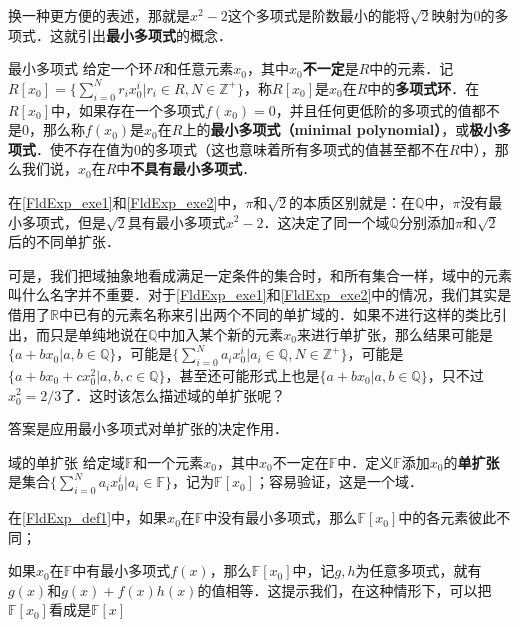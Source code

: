 换一种更方便的表述，那就是$x^2-2$这个多项式是阶数最小的能将$\sqrt{2}$映射为$0$的多项式．这就引出\textbf{最小多项式}的概念．

\begin{definition}{最小多项式}
给定一个环$R$和任意元素$x_0$，其中$x_0$\textbf{不一定}是$R$中的元素．记
$R[x_0]=\{\sum_{i=0}^N r_ix_0^i|r_i\in R, N\in\mathbb{Z}^+\}$，称$R[x_0]$是$x_0$在$R$中的\textbf{多项式环}．在$R[x_0]$中，如果存在一个多项式$f(x_0)=0$，并且任何更低阶的多项式的值都不是$0$，那么称$f(x_0)$是$x_0$在$R$上的\textbf{最小多项式（minimal polynomial）}，或\textbf{极小多项式}．使不存在值为$0$的多项式（这也意味着所有多项式的值甚至都不在$R$中），那么我们说，$x_0$在$R$中\textbf{不具有最小多项式}．
\end{definition}

在\autoref{FldExp_exe1}和\autoref{FldExp_exe2}中，$\pi$和$\sqrt{2}$的本质区别就是：在$\mathbb{Q}$中，$\pi$没有最小多项式，但是$\sqrt{2}$具有最小多项式$x^2-2$．这决定了同一个域$\mathbb{Q}$分别添加$\pi$和$\sqrt{2}$后的不同单扩张．

可是，我们把域抽象地看成满足一定条件的集合时，和所有集合一样，域中的元素叫什么名字并不重要．对于\autoref{FldExp_exe1}和\autoref{FldExp_exe2}中的情况，我们其实是借用了$\mathbb{R}$中已有的元素名称来引出两个不同的单扩域的．如果不进行这样的类比引出，而只是单纯地说在$\mathbb{Q}$中加入某个新的元素$x_0$来进行单扩张，那么结果可能是$\{a+bx_0|a, b\in\mathbb{Q}\}$，可能是$\{\sum_{i=0}^N a_ix_0^i|a_i\in\mathbb{Q}, N\in\mathbb{Z}^+\}$，可能是$\{a+bx_0+cx_0^2|a, b, c\in\mathbb{Q}\}$，甚至还可能形式上也是$\{a+bx_0|a, b\in\mathbb{Q}\}$，只不过$x_0^2=2/3$了．这时该怎么描述域的单扩张呢？

答案是应用最小多项式对单扩张的决定作用．

\begin{definition}{域的单扩张}\label{FldExp_def1}
给定域$\mathbb{F}$和一个元素$x_0$，其中$x_0$不一定在$\mathbb{F}$中．定义$\mathbb{F}$添加$x_0$的\textbf{单扩张}是集合$\{\sum_{i=0}^N a_ix_0^i|a_i\in\mathbb{F}\}$，记为$\mathbb{F}[x_0]$；容易验证，这是一个域．
\end{definition}

在\autoref{FldExp_def1}中，如果$x_0$在$\mathbb{F}$中没有最小多项式，那么$\mathbb{F}[x_0]$中的各元素彼此不同； 

如果$x_0$在$\mathbb{F}$中有最小多项式$f(x)$，那么$\mathbb{F}[x_0]$中，记$g, h$为任意多项式，就有$g(x)$和$g(x)+f(x)h(x)$的值相等．这提示我们，在这种情形下，可以把$\mathbb{F}[x_0]$看成是$\mathbb{F}[x]$




